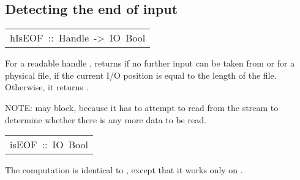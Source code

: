 \subsection{Detecting the end of input
}
\begin{haddockdesc}
\item[\begin{tabular}{@{}l}
hIsEOF\ ::\ Handle\ ->\ IO\ Bool
\end{tabular}]\haddockbegindoc
For a readable handle ,   returns
  if no further input can be taken from  or for a
 physical file, if the current I/O position is equal to the length of
 the file.  Otherwise, it returns .
\par
NOTE:  may block, because it has to attempt to read from
 the stream to determine whether there is any more data to be read.
\par

\end{haddockdesc}
\begin{haddockdesc}
\item[\begin{tabular}{@{}l}
isEOF\ ::\ IO\ Bool
\end{tabular}]\haddockbegindoc
The computation  is identical to ,
 except that it works only on .
\par

\end{haddockdesc}
